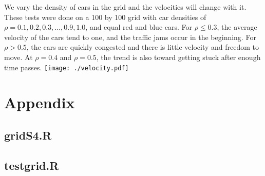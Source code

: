 \documentclass[11pt]{article}
\begin{document}
  We vary the density of cars in the grid and the velocities will
  change with it.  These tests were done on a 100 by 100 grid with car
  densities of $\rho=0.1,0.2,0.3,\ldots,0.9,1.0$, and equal red and
  blue cars.  For $\rho\leq0.3$, the average velocity of the cars tend
  to one, and the traffic jams occur in the beginning.  For
  $\rho>0.5$, the cars are quickly congested and there is little
  velocity and freedom to move.  At $\rho=0.4$ and $\rho=0.5$, the
  trend is also toward getting stuck after enough time passes.
\texttt{[image: ./velocity.pdf]}

\clearpage
\section{Appendix}
\label{sec-4}
\subsection{gridS4.R}
\label{sec-4-1}


\subsection{testgrid.R}
\label{sec-4-2}


\end{document}
